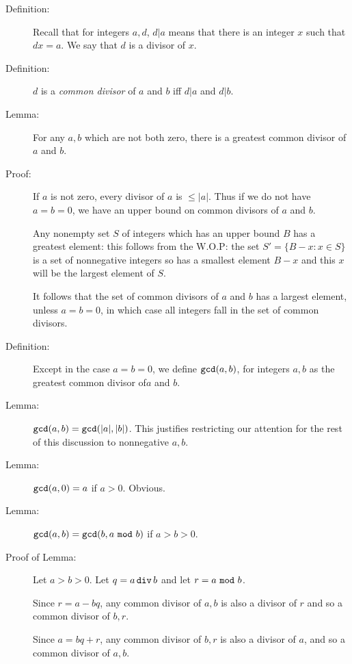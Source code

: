 \documentclass[12pt]{article}
\begin{document}
\begin{description}

\item[Definition:]  Recall that for integers $a,d$, $d|a$ means that there is an integer $x$ such that $dx=a$.  We say that $d$ is a divisor of $x$.

\item[Definition:]  $d$ is a {\em common divisor\/} of $a$ and $b$ iff $d|a$ and $d|b$.

\item[Lemma:]  For any $a,b$ which are not both zero, there is a greatest common divisor of $a$ and $b$.

\item[Proof:]  If $a$ is not zero, every divisor of $a$ is $\leq |a|$.  Thus if we do not have $a=b=0$, we have an upper bound on common divisors of $a$ and $b$.

Any nonempty set $S$ of integers which has an upper bound $B$ has a greatest element:  this follows from the W.O.P:  the set $S'=\{B-x:x \in S\}$ is a set of nonnegative integers so has a smallest element $B-x$ and this $x$ will be the largest element of $S$.

It follows that the set of common divisors of $a$ and $b$ has a largest element, unless $a=b=0$, in which case all integers fall in the set of common divisors.

\item[Definition:]  Except in the case $a=b=0$, we define ${\tt gcd}(a,b)$, for integers $a,b$ as the greatest common divisor of$a$ and $b$.

\item[Lemma:]   ${\tt gcd}(a,b) = {\tt gcd}(|a|,|b|)$.  This justifies restricting our attention for the rest of this discussion to nonnegative $a,b$.

\item[Lemma:]  ${\tt gcd}(a,0)=a$ if $a>0$.  Obvious.

\item[Lemma:] ${\tt gcd}(a,b) = {\tt gcd}(b,a\,\,{\tt mod}\,\,b)$ if $a>b>0$.

\item[Proof of Lemma:]  Let $a>b>0$.  Let $q=a\,{\tt div}\,b$ and let $r=a\,\,{\tt mod}\,\,b$.

Since $r=a-bq$, any common divisor of $a,b$ is also a divisor of $r$ and so a common divisor of $b,r$.

Since $a=bq+r$, any common divisor of $b,r$ is also a divisor of $a$, and so a common divisor of $a,b$.


\end{description}
\end{document}

